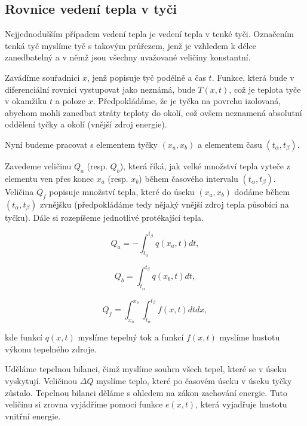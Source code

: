 \subsection{Rovnice vedení tepla v tyči}

Nejjednodušším případem vedení tepla je vedení tepla v tenké tyči. Označením tenká tyč myslíme tyč s takovým průřezem, jenž je vzhledem k délce zanedbatelný a v němž jsou všechny uvažované veličiny konstantní.

Zavádíme souřadnici $x$, jenž popisuje tyč podélně a čas $t$. Funkce, která bude v diferenciální rovnici vystupovat jako neznámá, bude $T(x,t)$, což je teplota tyče v okamžiku $t$ a poloze $x$. Předpokládáme, že je tyčka na povrchu izolovaná, abychom mohli zanedbat ztráty teploty do okolí, což ovšem neznamená absolutní oddělení tyčky a okolí (vnější zdroj energie). 

Nyní budeme pracovat s elementem tyčky $(x_a,x_b)$ a elementem času $(t_\alpha, t_\beta)$.

Zavedeme veličinu $Q_a$ (resp. $Q_b$), která říká, jak velké množství tepla vyteče z elementu ven přes konec $x_a$ (resp. $x_b$) během časového intervalu $(t_\alpha,t_\beta)$. Veličina $Q_f$ \mbox{popisuje} množství tepla, které do úseku $(x_a,x_b)$ dodáme během $(t_\alpha,t_\beta)$ zvnějšku (předpo\-kládáme tedy nějaký vnější zdroj tepla působící na tyčku). Dále si rozepíšeme \mbox{jednotlivé} protékající tepla.

\begin{equation}
Q_a =-\int_{t_\alpha}^{t_\beta} q(x_a,t) dt,   
\end{equation}

\begin{equation}
Q_b =\int_{t_\alpha}^{t_\beta} q(x_b,t) dt,   
\end{equation}

\begin{equation}
Q_f =\int_{x_a}^{x_b} \int_{t_\alpha}^{t_\beta} f(x,t) dt dx  ,
\end{equation}

kde funkcí $q(x,t)$ myslíme tepelný tok a funkcí $f(x,t)$ myslíme hustotu výkonu tepelného zdroje.

Uděláme tepelnou bilanci, čimž myslíme souhrn všech tepel, které se v úseku vyskytují. Veličinou $\Delta Q$ myslíme teplo, které po časovém úseku v úseku tyčky zůstalo. Tepelnou bilanci děláme s ohledem na zákon zachování energie. Tuto veličinu si zrovna vyjádříme pomocí funkce $e(x,t)$, která vyjadřuje hustotu vnitřní energie.


